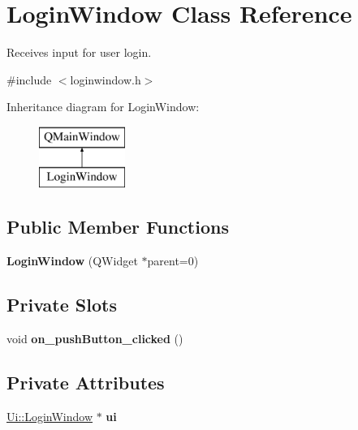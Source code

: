 \hypertarget{class_login_window}{}\section{Login\+Window Class Reference}
\label{class_login_window}


Receives input for user login.  




{\ttfamily \#include $<$loginwindow.\+h$>$}

Inheritance diagram for Login\+Window\+:\begin{figure}[H]
\begin{center}
\leavevmode
\includegraphics[height=2.000000cm]{class_login_window}
\end{center}
\end{figure}
\subsection*{Public Member Functions}
\begin{DoxyCompactItemize}
\item 
\mbox{\label{class_login_window_aacfb01de174b9eaf5a712bbfd4b6d9b5}} 
{\bfseries Login\+Window} (Q\+Widget $\ast$parent=0)
\end{DoxyCompactItemize}
\subsection*{Private Slots}
\begin{DoxyCompactItemize}
\item 
\mbox{\label{class_login_window_a446c7e979ad43939a935cffe02163305}} 
void {\bfseries on\+\_\+push\+Button\+\_\+clicked} ()
\end{DoxyCompactItemize}
\subsection*{Private Attributes}
\begin{DoxyCompactItemize}
\item 
\mbox{\label{class_login_window_a583f5c7dda98acd3e65791101f9ff2a0}} 
\mbox{\hyperlink{class_ui_1_1_login_window}{Ui\+::\+Login\+Window}} $\ast$ {\bfseries ui}
\end{DoxyCompactItemize}


